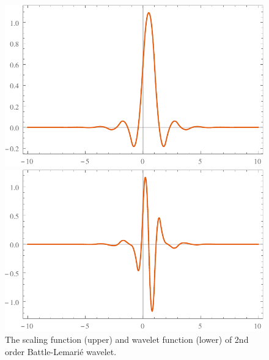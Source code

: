 \documentclass{book}
\begin{document}
\begin{figure}[h]
  \includegraphics{Figures/BL2WaveletPhi.pdf}
  
  \includegraphics{Figures/BL2WaveletPsi.pdf}
  \caption{The scaling function (upper) and wavelet function (lower) of 2nd
  order Battle-Lemari{\'e} wavelet.}
\end{figure}

\
\end{document}
